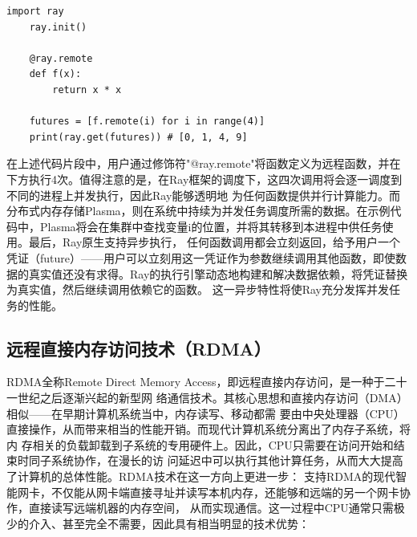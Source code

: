 \begin{minipage}{\linewidth}
\begin{lstlisting}[style=sysupython, caption=Ray代码示例]
	import ray
	ray.init()
	
	@ray.remote
	def f(x):
	    return x * x
	
	futures = [f.remote(i) for i in range(4)]
	print(ray.get(futures)) # [0, 1, 4, 9]
\end{lstlisting}
\end{minipage}

在上述代码片段中，用户通过修饰符"@ray.remote"将函数定义为远程函数，并在下方执行4次。值得注意的是，在Ray框架的调度下，这四次调用将会逐一调度到不同的进程上并发执行，因此Ray能够透明地
为任何函数提供并行计算能力。而分布式内存存储Plasma，则在系统中持续为并发任务调度所需的数据。在示例代码中，Plasma将会在集群中查找变量i的位置，并将其转移到本进程中供任务使用。最后，Ray原生支持异步执行，
任何函数调用都会立刻返回，给予用户一个凭证（future\cite{wang2021ownership}）——用户可以立刻用这一凭证作为参数继续调用其他函数，即使数据的真实值还没有求得。Ray的执行引擎动态地构建和解决数据依赖，将凭证替换为真实值，然后继续调用依赖它的函数。
这一异步特性将使Ray充分发挥并发任务的性能。

\subsection{远程直接内存访问技术（RDMA）}

RDMA全称Remote Direct Memory Access，即远程直接内存访问，是一种于二十一世纪之后逐渐兴起的新型网
络通信技术。其核心思想和直接内存访问（DMA）相似——在早期计算机系统当中，内存读写、移动都需
要由中央处理器（CPU）直接操作，从而带来相当的性能开销。而现代计算机系统分离出了内存子系统，将内
存相关的负载卸载到子系统的专用硬件上。因此，CPU只需要在访问开始和结束时同子系统协作，在漫长的访
问延迟中可以执行其他计算任务，从而大大提高了计算机的总体性能。RDMA技术在这一方向上更进一步：
支持RDMA的现代智能网卡，不仅能从网卡端直接寻址并读写本机内存，还能够和远端的另一个网卡协作，直接读写远端机器的内存空间，
从而实现通信。这一过程中CPU通常只需极少的介入、甚至完全不需要，因此具有相当明显的技术优势：

